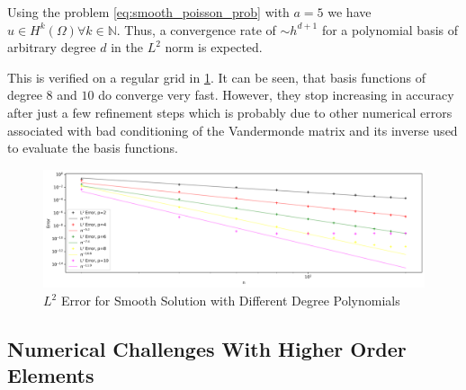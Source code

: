 \documentclass[11pt,a4paper]{article}
\begin{document}
Using the problem \ref{eq:smooth_poisson_prob} with $a = 5$ we have $u \in H^k(\Omega) \forall k \in \mathbb{N}$.
Thus, a convergence rate of $ \sim h^{d+1}$ for a polynomial basis of arbitrary degree $d$ in the $L^2$ norm is expected.

This is verified on a regular grid in \ref{fig:errors_smooth_highorder}.
It can be seen, that basis functions of degree $8$ and $10$ do converge very fast.
However, they stop increasing in accuracy after just a few refinement steps which is probably due to other numerical errors
associated with bad conditioning of the Vandermonde matrix and its inverse used to evaluate the basis functions.
\begin{figure}
  \centering
  \includegraphics[width=.8\linewidth]{errors_smooth_highorder_l2}
  \caption{$L^2$ Error for Smooth Solution with Different Degree Polynomials}
  \label{fig:errors_smooth_highorder}
\end{figure}



\subsection*{Numerical Challenges With Higher Order Elements}
\end{document}
